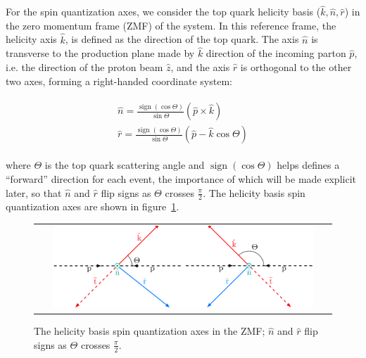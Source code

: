 For the spin quantization axes, we consider the top quark helicity basis ($\hat{k}, \hat{n}, \hat{r}$) in the zero momentum frame (ZMF) of the \ttbar system.
In this reference frame, the helicity axis $\hat{k}$, is defined as the direction of the top quark.
The axis $\hat{n}$ is transverse to the production plane made by $\hat{k}$ direction of the incoming parton $\hat{p}$, i.e. the direction of the proton beam $\hat{z}$, and the axis $\hat{r}$ is orthogonal to the other two axes, forming a right-handed coordinate system:
\begin{linenomath*}
\begin{align}
\begin{array}{c}
\hat{n}=\frac{\operatorname{sign}(\cos \Theta)}{\sin \Theta}(\hat{p} \times \hat{k}) \\
\hat{r}=\frac{\operatorname{sign}(\cos \Theta)}{\sin \Theta}(\hat{p} - \hat{k}\cos \Theta)
\end{array}
\label{helcity_basis}
\end{align}
\end{linenomath*}
where $\Theta$ is the top quark scattering angle and $\operatorname{sign}(\cos \Theta)$ helps defines a “forward” direction for each event, the importance of which will be made explicit later, so that $\hat{n}$ and $\hat{r}$ flip signs as $\Theta$ crosses $\frac{\pi}{2}$.
The helicity basis spin quantization axes are shown in figure~\ref{helicity_basis}.
\begin{figure}[htb]
  \begin{center}
    \begin{tabular}{c}
        \includegraphics[width=0.9\textwidth]{fig_TopQuark/helicity_basis.png}
    \end{tabular}
    \caption{The helicity basis spin quantization axes in the \ttbar ZMF;
            $\hat{n}$ and $\hat{r}$ flip signs as $\Theta$ crosses $\frac{\pi}{2}$.
            }
    \label{helicity_basis}
  \end{center}
\end{figure}

